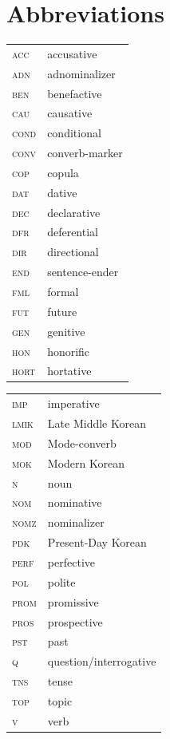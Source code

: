 \documentclass[output=paper,colorlinks,citecolor=brown]{langscibook}
\begin{document}
\section*{Abbreviations}

\begin{tabularx}{.5\textwidth}{@{}lQ@{}}
\textsc{acc} & accusative \\
\textsc{adn} & adnominalizer \\
\textsc{ben} & benefactive \\
\textsc{cau} & causative \\
\textsc{cond} & conditional \\
\textsc{conv} & converb-marker \\
\textsc{cop} & copula \\
\textsc{dat} & dative \\
\textsc{dec} & declarative \\
\textsc{dfr} & deferential \\
\textsc{dir} & directional \\
\textsc{end} & sentence-ender \\
\textsc{fml} & formal \\
\textsc{fut} & future \\
\textsc{gen} & genitive \\
\textsc{hon} & honorific \\
\textsc{hort} & hortative \\
\end{tabularx}%
\begin{tabularx}{.5\textwidth}{@{}lQ@{}}
\textsc{imp} & imperative \\
\textsc{lmik} & Late Middle Korean \\
\textsc{mod} & Mode-converb \\
\textsc{mok} & Modern Korean \\
\textsc{n} & noun \\
\textsc{nom} & nominative \\
\textsc{nomz} & nominalizer \\
\textsc{pdk} & Present-Day Korean \\
\textsc{perf} & perfective \\
\textsc{pol} & polite \\
\textsc{prom} & promissive \\
\textsc{pros} & prospective \\
\textsc{pst} & past \\
\textsc{q} & question/interrogative \\
\textsc{tns} & tense \\
\textsc{top} & topic \\
\textsc{v} & verb \\
\end{tabularx}
\end{document}
